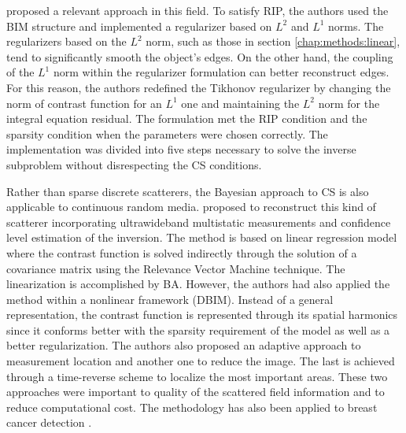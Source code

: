 			\cite{shah2016inverse} proposed a relevant approach in this field. To satisfy RIP, the authors used the BIM structure and implemented a regularizer based on $L^2$ and $L^1$ norms. The regularizers based on the $L^2$ norm, such as those in section \ref{chap:methods:linear}, tend to significantly smooth the object's edges. On the other hand, the coupling of the $L^1$ norm within the regularizer formulation can better reconstruct edges. For this reason, the authors redefined the Tikhonov regularizer by changing the norm of contrast function for an $L^1$ one and maintaining the $L^2$ norm for the integral equation residual. The formulation met the RIP condition and the sparsity condition when the parameters were chosen correctly. The implementation was divided into five steps necessary to solve the inverse subproblem without disrespecting the CS conditions.
	
			Rather than sparse discrete scatterers, the Bayesian approach to CS is also applicable to continuous random media. \cite{fouda2014bayesian} proposed to reconstruct this kind of scatterer incorporating ultrawideband multistatic measurements and confidence level estimation of the inversion. The method is based on linear regression model where the contrast function is solved indirectly through the solution of a covariance matrix using the Relevance Vector Machine technique. The linearization is accomplished by BA. However, the authors had also applied the method within a nonlinear framework (DBIM). Instead of a general representation, the contrast function is represented through its spatial harmonics since it conforms better with the sparsity requirement of the model as well as a better regularization. The authors also proposed an adaptive approach to measurement location and another one to reduce the image. The last is achieved through a time-reverse scheme to localize the most important areas. These two approaches were important to quality of the scattered field information and to reduce computational cost. The methodology has also been applied to breast cancer detection \citep{fouda2014ultra}.
	
